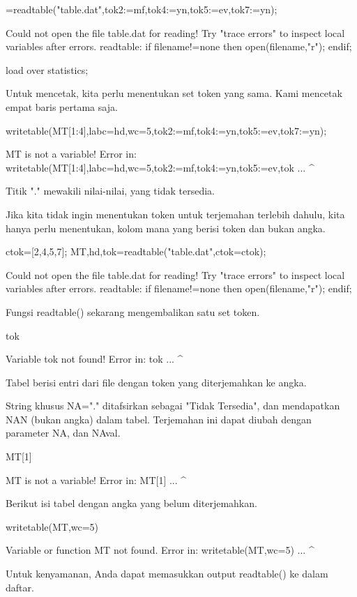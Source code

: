 \documentclass{article}
\begin{document}
=readtable("table.dat",tok2:=mf,tok4:=yn,tok5:=ev,tok7:=yn);


    Could not open the file
    table.dat
    for reading!
    Try "trace errors" to inspect local variables after errors.
    readtable:
        if filename!=none then open(filename,"r"); endif;

\>load over statistics;


Untuk mencetak, kita perlu menentukan set token yang sama. Kami
mencetak empat baris pertama saja.


\>writetable(MT[1:4],labc=hd,wc=5,tok2:=mf,tok4:=yn,tok5:=ev,tok7:=yn);


    MT is not a variable!
    Error in:
    writetable(MT[1:4],labc=hd,wc=5,tok2:=mf,tok4:=yn,tok5:=ev,tok ...
                      ^

Titik "." mewakili nilai-nilai, yang tidak tersedia.


Jika kita tidak ingin menentukan token untuk terjemahan terlebih
dahulu, kita hanya perlu menentukan, kolom mana yang berisi token dan
bukan angka.


\>ctok=[2,4,5,7]; {MT,hd,tok}=readtable("table.dat",ctok=ctok);


    Could not open the file
    table.dat
    for reading!
    Try "trace errors" to inspect local variables after errors.
    readtable:
        if filename!=none then open(filename,"r"); endif;

Fungsi readtable() sekarang mengembalikan satu set token.


\>tok


    Variable tok not found!
    Error in:
    tok ...
       ^

Tabel berisi entri dari file dengan token yang diterjemahkan ke angka.


String khusus NA="." ditafsirkan sebagai "Tidak Tersedia", dan
mendapatkan NAN (bukan angka) dalam tabel. Terjemahan ini dapat diubah
dengan parameter NA, dan NAval.


\>MT[1]


    MT is not a variable!
    Error in:
    MT[1] ...
         ^

Berikut isi tabel dengan angka yang belum diterjemahkan.


\>writetable(MT,wc=5)


    Variable or function MT not found.
    Error in:
    writetable(MT,wc=5) ...
                 ^

Untuk kenyamanan, Anda dapat memasukkan output readtable() ke dalam
daftar.
\end{document}

